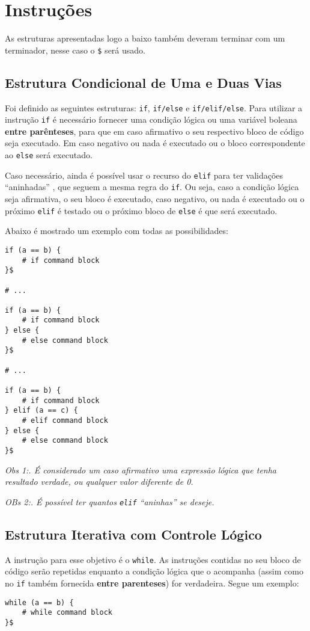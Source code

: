 \documentclass[a4paper,11pt]{article}
\begin{document}
\section{Instruções}
As estruturas apresentadas logo a baixo também deveram terminar com um terminador, nesse caso
o \texttt{\$} será usado.

\subsection{Estrutura Condicional de Uma e Duas Vias}
Foi definido as seguintes estruturas: \texttt{if}, \texttt{if/else} e \texttt{if/elif/else}.
Para utilizar a instrução \texttt{if} é necessário fornecer uma condição lógica ou uma variável
boleana \textbf{entre parênteses}, para que em caso afirmativo o seu respectivo bloco de código
seja executado. Em caso negativo ou nada é executado ou o bloco correspondente ao \texttt{else}
será executado.

Caso necessário, ainda é possível usar o recurso do \texttt{elif} para ter validações ``aninhadas''
, que seguem a mesma regra do \texttt{if}. Ou seja, caso a condição lógica seja afirmativa, o seu
bloco é executado, caso negativo, ou nada é executado ou o próximo \texttt{elif} é testado ou
o próximo bloco de \texttt{else} é que será executado.

Abaixo é mostrado um exemplo com todas as possibilidades:
\begin{lstlisting}
if (a == b) {
    # if command block
}$

# ...

if (a == b) {
    # if command block
} else {
    # else command block
}$

# ...

if (a == b) {
    # if command block
} elif (a == c) {
    # elif command block
} else {
    # else command block
}$
\end{lstlisting}

\textit{Obs 1:. É considerado um caso afirmativo uma expressão lógica que tenha resultado verdade,
ou qualquer valor diferente de 0.}

\textit{OBs 2:. É possível ter quantos \texttt{elif} ``aninhas'' se deseje.}

\subsection{Estrutura Iterativa com Controle Lógico}
A instrução para esse objetivo é o \texttt{while}. As instruções contidas no seu bloco de código
serão repetidas enquanto a condição lógica que o acompanha (assim como no \texttt{if} também
fornecida \textbf{entre parenteses}) for verdadeira. Segue um exemplo:
\begin{lstlisting}
while (a == b) {
    # while command block
}$
\end{lstlisting}
\end{document}
